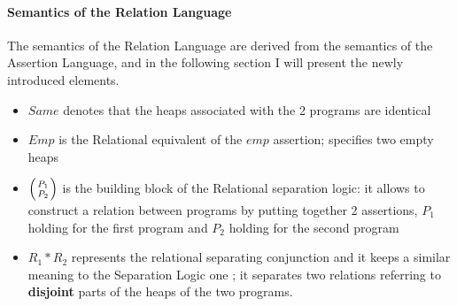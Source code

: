 \documentclass[12pt,a4paper]{article}
\begin{document}
\paragraph{Semantics of the Relation Language}
The semantics of the Relation Language are derived from the semantics of the Assertion Language, and in the following section I will present the newly introduced elements. 
\begin{itemize}
	\item{ \(Same\) denotes that the heaps associated with the 2 programs are identical}
	\item{ \(Emp\) is the Relational equivalent of the \(emp\) assertion; specifies two empty heaps}
	\item{ \(\left(P_1 \atop P_2\right)\) is the building block of the Relational separation logic: it allows to construct a relation between programs by putting together 2 assertions, \(P_1\) holding for the first program and \(P_2\) holding for the second program}
	\item{ \(R_1 * R_2\) represents the relational separating conjunction and it keeps a similar meaning to the Separation Logic one ; it separates two relations referring to \textbf{disjoint} parts of the heaps of the two programs.}
\end{itemize}
\end{document}
